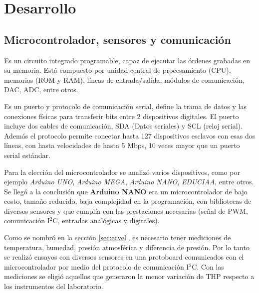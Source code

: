 \newpage
\section{Desarrollo}  \label{sec:desarr}

\subsection{Microcontrolador, sensores y comunicación}


\begin{tcolorbox}[colback=blue!5!white,colframe=blue!75!black,title=Microcontrolador] Es un circuito integrado programable, capaz de ejecutar las órdenes grabadas en su memoria. Está compuesto por unidad central de procesamiento (CPU), memorias (ROM y RAM), líneas de entrada/salida, módulos de comunicación, DAC, ADC, entre otros.
\end{tcolorbox}

\begin{tcolorbox}[colback=blue!5!white,colframe=blue!75!black,title=I$^2$C]
	Es un puerto y protocolo de comunicación serial, define la trama de datos y las conexiones físicas para transferir bits entre 2 dispositivos digitales. El puerto incluye dos cables de comunicación, SDA (Datos seriales) y SCL (reloj serial). Además el protocolo permite conectar hasta 127 dispositivos esclavos con esas dos líneas, con hasta velocidades de hasta 5 Mbps, 10 veces mayor que un puerto serial estándar. \end{tcolorbox}



	

Para la elección del microcontrolador se analizó varios dispositivos, como por ejemplo \textit{Arduino UNO}, \textit{Arduino MEGA}, \textit{Arduino NANO}, \textit{EDUCIAA}, entre otros. Se llegó a la conclusión que \textbf{Arduino NANO} era un microcontrolador de bajo costo, tamaño reducido, baja complejidad en la programación, con bibliotecas de diversos sensores y que cumplía con las prestaciones necesarias (señal de PWM, comunicación I$^2$C, entradas analógicas y digitales).

Como se nombró en la sección \ref{sec:ecvel}, es necesario tener mediciones de temperatura, humedad, presión atmosférica y diferencia de presión. Por lo tanto se realizó ensayos con diversos sensores en una protoboard comunicados con el microcontrolador por medio del protocolo de comunicación I$^2$C. Con las mediciones se eligió aquellos que generaron la menor variación de THP respecto a los instrumentos del laboratorio. 

